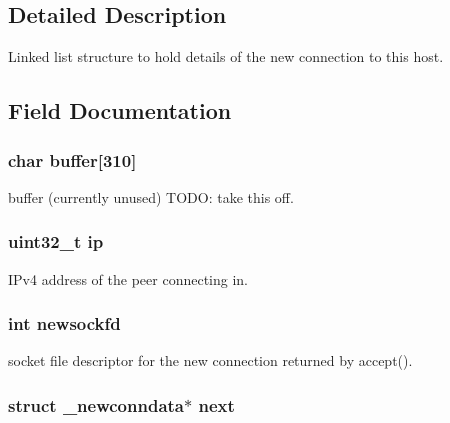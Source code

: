\subsection{\-Detailed \-Description}
\-Linked list structure to hold details of the new connection to this host. 

\subsection{\-Field \-Documentation}
\hypertarget{struct__newconndata_a0f29c4c04d503e5e385795a66dfe6890}{
\subsubsection[{buffer}]{\setlength{\rightskip}{0pt plus 5cm}char {\bf buffer}\mbox{[}310\mbox{]}}}\label{struct__newconndata_a0f29c4c04d503e5e385795a66dfe6890}


buffer (currently unused) \-T\-O\-D\-O\-: take this off. 

\hypertarget{struct__newconndata_a69ddb9c845da426f636d9dd0dbed4e7e}{
\subsubsection[{ip}]{\setlength{\rightskip}{0pt plus 5cm}uint32\-\_\-t {\bf ip}}}\label{struct__newconndata_a69ddb9c845da426f636d9dd0dbed4e7e}


\-I\-Pv4 address of the peer connecting in. 

\hypertarget{struct__newconndata_aefdd831ed1cd73e50f980063361576ba}{
\subsubsection[{newsockfd}]{\setlength{\rightskip}{0pt plus 5cm}int {\bf newsockfd}}}\label{struct__newconndata_aefdd831ed1cd73e50f980063361576ba}


socket file descriptor for the new connection returned by accept(). 

\hypertarget{struct__newconndata_a0fb3e0f3ffb0464599792063a7b86388}{
\subsubsection[{next}]{\setlength{\rightskip}{0pt plus 5cm}struct {\bf \-\_\-newconndata}$\ast$ {\bf next}}}\label{struct__newconndata_a0fb3e0f3ffb0464599792063a7b86388}


